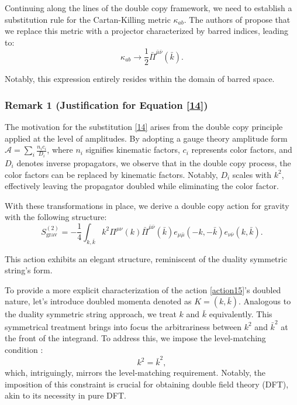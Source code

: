 \documentclass[13pt]{article}
\begin{document}
Continuing along the lines of the double copy framework, we need to establish a substitution rule for the Cartan-Killing metric $\kappa_{ab}$. The authors of \cite{D_az_Jaramillo_2022} propose that we replace this metric with a projector characterized by barred indices, leading to:
\begin{equation}
\kappa_{ab} \rightarrow \frac{1}{2} \bar{\Pi}^{\bar{\mu} \bar{\nu}}(\bar{k}). \tag{14}
\label{14}
\end{equation}

Notably, this expression entirely resides within the domain of barred space.

\subsubsection*{Remark 1 (Justification for Equation \eqref{14})}
The motivation for the substitution \eqref{14} arises from the double copy principle applied at the level of amplitudes. By adopting a gauge theory amplitude form $\mathcal{A} = \sum_i \frac{n_i c_i}{D_i}$, where $n_i$ signifies kinematic factors, $c_i$ represents color factors, and $D_i$ denotes inverse propagators, we observe that in the double copy process, the color factors can be replaced by kinematic factors. Notably, $D_i$ scales with $k^2$, effectively leaving the propagator doubled while eliminating the color factor.

With these transformations in place, we derive a double copy action for gravity with the following structure:
\begin{equation}
S_{\text{grav}}^{(2)} = - \frac{1}{4} \int_{k, \bar{k}} k^2 \Pi^{\mu \nu}(k) \bar{\Pi}^{\bar{\mu}\bar{\nu}}(\bar{k}) e_{\mu \bar{\mu}}(-k, -\bar{k})e_{\nu \bar{\nu}}(k, \bar{k}). \tag{15}
\label{action15}
\end{equation}

This action exhibits an elegant structure, reminiscent of the duality symmetric string's form.

To provide a more explicit characterization of the action \eqref{action15}'s doubled nature, let's introduce doubled momenta denoted as $K = (k, \bar{k})$. Analogous to the duality symmetric string approach, we treat $k$ and $\bar{k}$ equivalently. This symmetrical treatment brings into focus the arbitrariness between $k^2$ and $\bar{k}^2$ at the front of the integrand. To address this, we impose the level-matching condition \cite{hull2009double,hull2009gauge,hohm2010background,hohm2010generalized}:
\begin{equation}
k^2 = \bar{k}^2, \tag{16}
\label{level matching}
\end{equation}
which, intriguingly, mirrors the level-matching requirement. Notably, the imposition of this constraint is crucial for obtaining double field theory (DFT), akin to its necessity in pure DFT.
\end{document}
